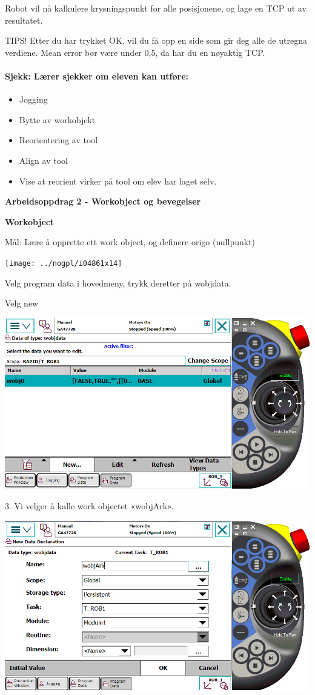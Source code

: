 Robot vil nå kalkulere krysningspunkt for alle posisjonene, og lage
en TCP ut av resultatet.

\vspace{1cm}

TIPS! Etter du har trykket OK, vil du få opp en side som gir deg alle
de utregna verdiene. Mean error bør være under 0,5, da har du en nøyaktig
TCP.

\paragraph{Sjekk: Lærer sjekker om eleven kan utføre:}
\begin{itemize}
\item Jogging
\item Bytte av workobjekt
\item Reorientering av tool
\item Align av tool
\item Vise at reorient virker på tool om elev har laget selv.
\end{itemize}


\textbf{Arbeidsoppdrag 2 - Workobject og bevegelser}

\textbf{Workobject}

Mål: Lære å opprette ett work object, og definere origo (nullpunkt)

\texttt{[image: ../nogpl/i04861x14]}

Velg program data i hovedmeny, trykk deretter på wobjdata.

Velg new

\includegraphics[width=1\textwidth]{i04861x15}

3. Vi velger å kalle work objectet «wobjArk».

\includegraphics[width=1\textwidth]{i04861x16}

